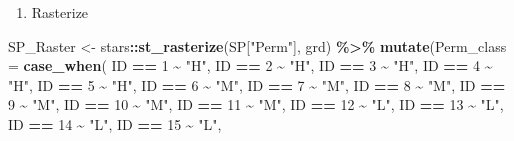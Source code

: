 \documentclass[
  12pt,
]{article}
\newenvironment{Shaded}{\begin{snugshade}}{\end{snugshade}}
\newcommand{\DataTypeTok}[1]{\textcolor[rgb]{0.13,0.29,0.53}{#1}}
\newcommand{\DecValTok}[1]{\textcolor[rgb]{0.00,0.00,0.81}{#1}}
\newcommand{\KeywordTok}[1]{\textcolor[rgb]{0.13,0.29,0.53}{\textbf{#1}}}
\newcommand{\NormalTok}[1]{#1}
\newcommand{\OperatorTok}[1]{\textcolor[rgb]{0.81,0.36,0.00}{\textbf{#1}}}
\newcommand{\StringTok}[1]{\textcolor[rgb]{0.31,0.60,0.02}{#1}}
\providecommand{\tightlist}{%
  \setlength{\itemsep}{0pt}\setlength{\parskip}{0pt}}
\begin{document}
\begin{enumerate}
\def\labelenumi{\alph{enumi})}
\setcounter{enumi}{1}
\tightlist
\item
  Rasterize
\end{enumerate}

\begin{Shaded}
\begin{Highlighting}[]
\NormalTok{  SP\_Raster \textless{}{-}}\StringTok{ }\NormalTok{stars}\OperatorTok{::}\KeywordTok{st\_rasterize}\NormalTok{(SP[}\StringTok{"Perm"}\NormalTok{], grd) }\OperatorTok{\%\textgreater{}\%}
\StringTok{    }\KeywordTok{mutate}\NormalTok{(}\DataTypeTok{Perm\_class =} \KeywordTok{case\_when}\NormalTok{(}
\NormalTok{      ID }\OperatorTok{==}\StringTok{ }\DecValTok{1}   \OperatorTok{\textasciitilde{}}\StringTok{ "H"}\NormalTok{,}
\NormalTok{      ID }\OperatorTok{==}\StringTok{ }\DecValTok{2}   \OperatorTok{\textasciitilde{}}\StringTok{ "H"}\NormalTok{,}
\NormalTok{      ID }\OperatorTok{==}\StringTok{ }\DecValTok{3}   \OperatorTok{\textasciitilde{}}\StringTok{ "H"}\NormalTok{,}
\NormalTok{      ID }\OperatorTok{==}\StringTok{ }\DecValTok{4}   \OperatorTok{\textasciitilde{}}\StringTok{ "H"}\NormalTok{,}
\NormalTok{      ID }\OperatorTok{==}\StringTok{ }\DecValTok{5}   \OperatorTok{\textasciitilde{}}\StringTok{ "H"}\NormalTok{,}
\NormalTok{      ID }\OperatorTok{==}\StringTok{ }\DecValTok{6}   \OperatorTok{\textasciitilde{}}\StringTok{ "M"}\NormalTok{,}
\NormalTok{      ID }\OperatorTok{==}\StringTok{ }\DecValTok{7}   \OperatorTok{\textasciitilde{}}\StringTok{ "M"}\NormalTok{,}
\NormalTok{      ID }\OperatorTok{==}\StringTok{ }\DecValTok{8}   \OperatorTok{\textasciitilde{}}\StringTok{ "M"}\NormalTok{,}
\NormalTok{      ID }\OperatorTok{==}\StringTok{ }\DecValTok{9}   \OperatorTok{\textasciitilde{}}\StringTok{ "M"}\NormalTok{,}
\NormalTok{      ID }\OperatorTok{==}\StringTok{ }\DecValTok{10}  \OperatorTok{\textasciitilde{}}\StringTok{ "M"}\NormalTok{,}
\NormalTok{      ID }\OperatorTok{==}\StringTok{ }\DecValTok{11}  \OperatorTok{\textasciitilde{}}\StringTok{ "M"}\NormalTok{,}
\NormalTok{      ID }\OperatorTok{==}\StringTok{ }\DecValTok{12}  \OperatorTok{\textasciitilde{}}\StringTok{ "L"}\NormalTok{,}
\NormalTok{      ID }\OperatorTok{==}\StringTok{ }\DecValTok{13}  \OperatorTok{\textasciitilde{}}\StringTok{ "L"}\NormalTok{,}
\NormalTok{      ID }\OperatorTok{==}\StringTok{ }\DecValTok{14}  \OperatorTok{\textasciitilde{}}\StringTok{ "L"}\NormalTok{,}
\NormalTok{      ID }\OperatorTok{==}\StringTok{ }\DecValTok{15}  \OperatorTok{\textasciitilde{}}\StringTok{ "L"}\NormalTok{,}

\end{Highlighting}
\end{Shaded}
\end{document}
